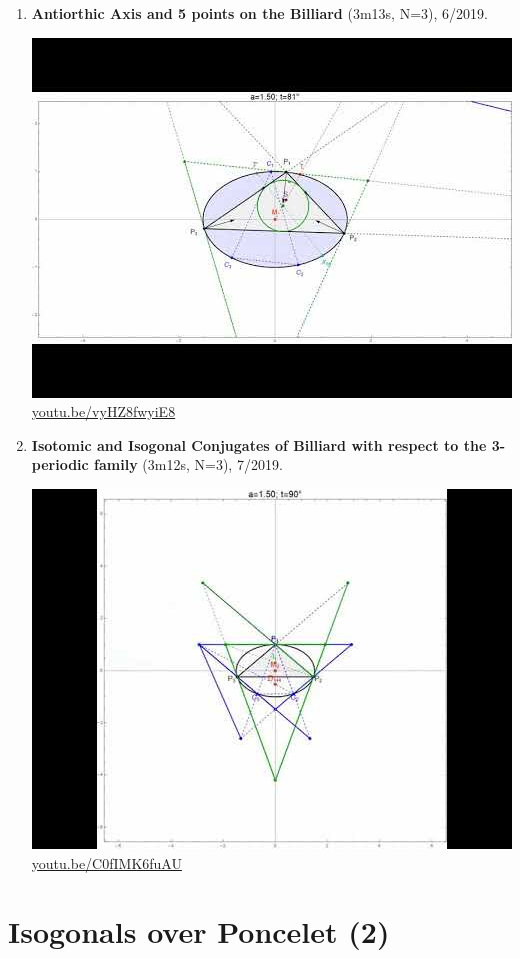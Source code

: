 \documentclass[12pt]{amsart}
\begin{document}
\begin{enumerate}[resume]
\item \textbf{Antiorthic Axis and 5 points on the Billiard} (3m13s, N=3), 6/2019. 
\begin{center}\includegraphics[width=.5\textwidth]{pics/vyHZ8fwyiE8.jpg} \\ 
\href{https://youtu.be/vyHZ8fwyiE8}{\url{youtu.be/vyHZ8fwyiE8}}\end{center}
% 
\item \textbf{Isotomic and Isogonal Conjugates of Billiard with respect to the 3-periodic family} (3m12s, N=3), 7/2019. 
\begin{center}\includegraphics[width=.5\textwidth]{pics/C0fIMK6fuAU.jpg} \\ 
\href{https://youtu.be/C0fIMK6fuAU}{\url{youtu.be/C0fIMK6fuAU}}\end{center}
% 
\end{enumerate}

\section{Isogonals over Poncelet (2)}
\end{document}
